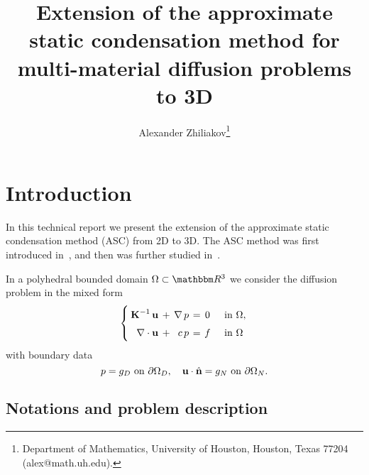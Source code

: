 

\title{Extension of the approximate static condensation method for multi-material diffusion problems to 3D}
\author{
	Alexander Zhiliakov\thanks{Department of Mathematics, University of Houston, Houston, Texas 77204 (alex@math.uh.edu).}
}


	
\maketitle

\tableofcontents
\vfill
\clearpage
\let\oldtabular\tabular
\renewcommand{\tabular}[1][1.5]{\def\arraystretch{#1}\oldtabular}

\section{Introduction}

In this technical report we present the extension of the approximate static condensation method (ASC) from 2D to 3D. The ASC method was first introduced in~\cite{kikinzon2017approximate}, and then was further studied in~\cite{ZHILIAKOV2019333}. 


In a polyhedral bounded domain $\Omega \subset \Rn{3}$ we consider the diffusion problem in the mixed form
\begin{equation}\label{dual}
	\arraycolsep=2pt\def\arraystretch{1.5}
	\left\{\begin{array}{rcrccl}
	\vect K^{-1}\,\vect u & + & \nabla\,p & = & 0 &\quad\text{in } \Omega , \\
	\nabla\cdot\vect u    & + & c\,p      & = & f &\quad\text{in } \Omega
	\end{array}\right.
\end{equation}
with boundary data
\begin{equation}
	p = g_D \text{ on } \partial\Omega_D,\quad
	\boldsymbol{\mathbf{u}} \cdot \hat{\boldsymbol{\mathbf{n}}} = g_N \text{ on } \partial\Omega_N. \label{dual:bc}
\end{equation}

\subsection{Notations and problem description}

